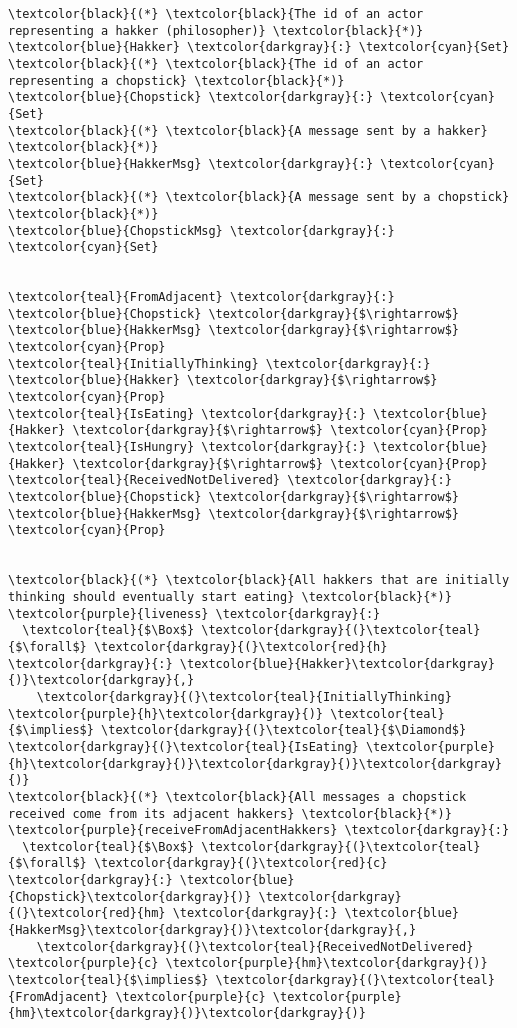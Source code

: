 \begin{Verbatim}[commandchars=\\\{\},codes={\catcode`$=3}]
\textcolor{black}{(*} \textcolor{black}{The id of an actor representing a hakker (philosopher)} \textcolor{black}{*)}
\textcolor{blue}{Hakker} \textcolor{darkgray}{:} \textcolor{cyan}{Set}
\textcolor{black}{(*} \textcolor{black}{The id of an actor representing a chopstick} \textcolor{black}{*)}
\textcolor{blue}{Chopstick} \textcolor{darkgray}{:} \textcolor{cyan}{Set}
\textcolor{black}{(*} \textcolor{black}{A message sent by a hakker} \textcolor{black}{*)}
\textcolor{blue}{HakkerMsg} \textcolor{darkgray}{:} \textcolor{cyan}{Set}
\textcolor{black}{(*} \textcolor{black}{A message sent by a chopstick} \textcolor{black}{*)}
\textcolor{blue}{ChopstickMsg} \textcolor{darkgray}{:} \textcolor{cyan}{Set}


\textcolor{teal}{FromAdjacent} \textcolor{darkgray}{:} \textcolor{blue}{Chopstick} \textcolor{darkgray}{$\rightarrow$} \textcolor{blue}{HakkerMsg} \textcolor{darkgray}{$\rightarrow$} \textcolor{cyan}{Prop}
\textcolor{teal}{InitiallyThinking} \textcolor{darkgray}{:} \textcolor{blue}{Hakker} \textcolor{darkgray}{$\rightarrow$} \textcolor{cyan}{Prop}
\textcolor{teal}{IsEating} \textcolor{darkgray}{:} \textcolor{blue}{Hakker} \textcolor{darkgray}{$\rightarrow$} \textcolor{cyan}{Prop}
\textcolor{teal}{IsHungry} \textcolor{darkgray}{:} \textcolor{blue}{Hakker} \textcolor{darkgray}{$\rightarrow$} \textcolor{cyan}{Prop}
\textcolor{teal}{ReceivedNotDelivered} \textcolor{darkgray}{:} \textcolor{blue}{Chopstick} \textcolor{darkgray}{$\rightarrow$} \textcolor{blue}{HakkerMsg} \textcolor{darkgray}{$\rightarrow$} \textcolor{cyan}{Prop}


\textcolor{black}{(*} \textcolor{black}{All hakkers that are initially thinking should eventually start eating} \textcolor{black}{*)}
\textcolor{purple}{liveness} \textcolor{darkgray}{:} 
  \textcolor{teal}{$\Box$} \textcolor{darkgray}{(}\textcolor{teal}{$\forall$} \textcolor{darkgray}{(}\textcolor{red}{h} \textcolor{darkgray}{:} \textcolor{blue}{Hakker}\textcolor{darkgray}{)}\textcolor{darkgray}{,} 
    \textcolor{darkgray}{(}\textcolor{teal}{InitiallyThinking} \textcolor{purple}{h}\textcolor{darkgray}{)} \textcolor{teal}{$\implies$} \textcolor{darkgray}{(}\textcolor{teal}{$\Diamond$} \textcolor{darkgray}{(}\textcolor{teal}{IsEating} \textcolor{purple}{h}\textcolor{darkgray}{)}\textcolor{darkgray}{)}\textcolor{darkgray}{)}
\textcolor{black}{(*} \textcolor{black}{All messages a chopstick received come from its adjacent hakkers} \textcolor{black}{*)}
\textcolor{purple}{receiveFromAdjacentHakkers} \textcolor{darkgray}{:} 
  \textcolor{teal}{$\Box$} \textcolor{darkgray}{(}\textcolor{teal}{$\forall$} \textcolor{darkgray}{(}\textcolor{red}{c} \textcolor{darkgray}{:} \textcolor{blue}{Chopstick}\textcolor{darkgray}{)} \textcolor{darkgray}{(}\textcolor{red}{hm} \textcolor{darkgray}{:} \textcolor{blue}{HakkerMsg}\textcolor{darkgray}{)}\textcolor{darkgray}{,} 
    \textcolor{darkgray}{(}\textcolor{teal}{ReceivedNotDelivered} \textcolor{purple}{c} \textcolor{purple}{hm}\textcolor{darkgray}{)} \textcolor{teal}{$\implies$} \textcolor{darkgray}{(}\textcolor{teal}{FromAdjacent} \textcolor{purple}{c} \textcolor{purple}{hm}\textcolor{darkgray}{)}\textcolor{darkgray}{)}
\end{Verbatim}
